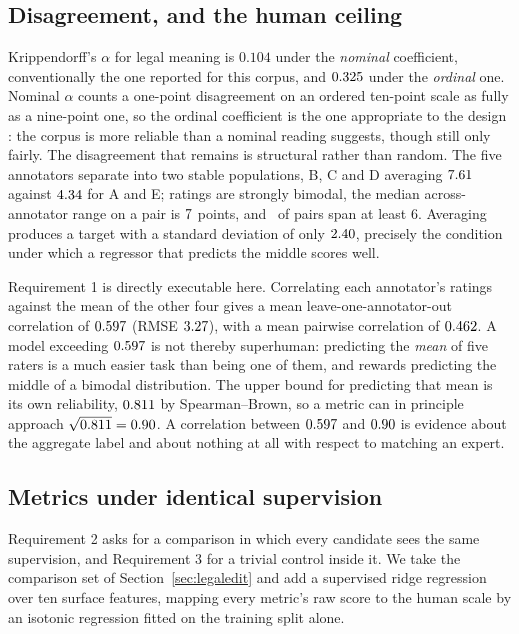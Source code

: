 \documentclass[11pt]{article}
\begin{document}
\subsection{Disagreement, and the human ceiling}
\label{sec:agreement}
\label{sec:ceiling}

Krippendorff's $\alpha$ for legal meaning is $0.104$ under the \emph{nominal}
coefficient, conventionally the one reported for this corpus, and $0.325$
under the \emph{ordinal} one. Nominal $\alpha$ counts a one-point disagreement
on an ordered ten-point scale as fully as a nine-point one, so the ordinal
coefficient is the one appropriate to the design
\citep{krippendorff2004content}: the corpus is more reliable than a nominal
reading suggests, though still only fairly. The disagreement that remains is
structural rather than random. The five annotators separate into two stable
populations, B, C and D averaging $7.61$ against $4.34$ for A and
E; ratings are strongly bimodal, the median across-annotator range on a pair is
$7$ points, and \pctSpreadSix\ of pairs span at least $6$. Averaging produces a target with a standard deviation
of only $2.40$, precisely the condition under which a regressor that
predicts the middle scores well.

Requirement 1 is directly executable here. Correlating each annotator's ratings
against the mean of the other four gives a mean leave-one-annotator-out
correlation of $0.597$ (RMSE $3.27$), with a mean pairwise correlation of
$0.462$. A model exceeding $0.597$ is not thereby superhuman: predicting
the \emph{mean} of five raters is a much easier task than being one of them, and
rewards predicting the middle of a bimodal distribution. The upper bound for
predicting that mean is its own reliability, $0.811$ by Spearman--Brown, so a
metric can in principle approach $\sqrt{0.811}=0.90$. A correlation between
$0.597$ and $0.90$ is evidence about the aggregate label and about nothing
at all with respect to matching an expert.

\subsection{Metrics under identical supervision}
\label{sec:baselines}

Requirement 2 asks for a comparison in which every candidate sees the same
supervision, and Requirement 3 for a trivial control inside it. We take the
comparison set of Section~\ref{sec:legaledit} and add a supervised ridge
regression over ten surface features, mapping every metric's raw score to the
human scale by an isotonic regression fitted on the training split alone.
\end{document}
